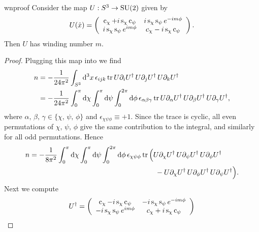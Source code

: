 \begin{proposition}{}{wnproof}
Consider the map $U:S^3\to\operatorname{SU}(2)$ given by
$$
U(\hat{x})=\left(\begin{array}{cc}
             \operatorname{c}_\chi+i\operatorname{s}_\chi\operatorname{c}_\psi     & i\operatorname{s}_\chi\operatorname{s}_\psi e^{-im\phi}\\
             i\operatorname{s}_\chi\operatorname{s}_\psi e^{im\phi}& c_\chi-i\operatorname{s}_\chi\operatorname{c}_\psi 
            \end{array}\right).
$$
Then $U$ has winding number $m$.
\begin{proof}
  Plugging this map into  we find
  \begin{equation*}
  \begin{aligned}
    n&=-\frac{1}{24\pi^2}\int_{S^3} \dd[3]{x}\epsilon_{ijk}\tr
        U\partial_i U^\dagger\,U\partial_j U^\dagger\,U\partial_k U^\dagger\\
     &=-\frac{1}{24\pi^2}\int_0^\pi\dd\chi\int_0^\pi\dd{\psi}\int_0^{2\pi}
        \dd{\phi}\epsilon_{\alpha\beta\gamma}\tr
        U\partial_\alpha U^\dagger\,U\partial_\beta U^\dagger\,
        U\partial_\gamma U^\dagger,\\
  \end{aligned}
  \end{equation*}
  where $\alpha,\,\beta,\,\gamma\in\{\chi,\,\psi,\,\phi\}$ and
  $\epsilon_{\chi\psi\phi}\equiv+1$.
  Since the trace is cyclic, all even permutations of $\chi,\,\psi,\,\phi$ give
  the same contribution to the integral, and similarly for all odd
  permutations. Hence
  \begin{equation*}\begin{aligned}
    n=-\frac{1}{8\pi^2}\int_0^\pi\dd{\chi}\int_0^\pi\dd\psi\int_0^{2\pi}
        \dd{\phi}\epsilon_{\chi\psi\phi}&\tr\Big(
        U\partial_\chi U^\dagger\,U\partial_\psi U^\dagger\,
        U\partial_\phi U^\dagger\\
        &~~~~~~-U\partial_\chi U^\dagger\,U\partial_\phi U^\dagger\,
        U\partial_\psi U^\dagger\Big).
  \end{aligned}\end{equation*}
  Next we compute
  \begin{equation*}
  \begin{aligned}
    U^\dagger&=\left(\begin{array}{cc}
                  \co_\chi-i\s_\chi\co_\psi & -i\s_\chi\s_\psi e^{-im\phi}\\
                 -i\s_\chi\s_\psi e^{im\phi}& c_\chi+i\s_\chi\co_\psi 
                \end{array}\right)\\

\end{aligned}
\end{equation*}
\end{proof}
\end{proposition}
